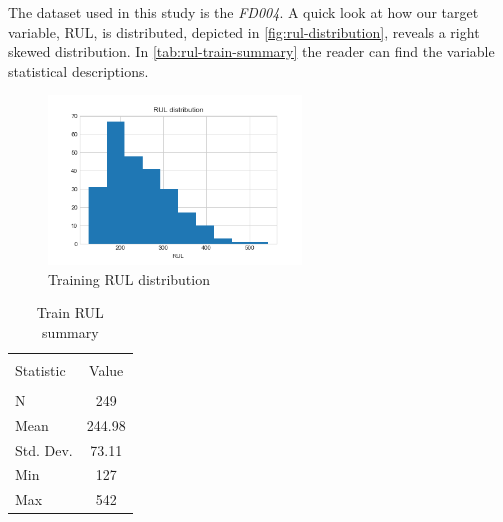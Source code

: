 \documentclass[letterpaper, 10 pt, conference, onecolumn]{ieeeconf}  %
\begin{document}
The dataset used in this study is the \textit{FD004}. A quick look at how our target variable, RUL, is distributed, depicted in \autoref{fig:rul-distribution}, reveals a right skewed distribution. In \autoref{tab:rul-train-summary} the reader can find the variable statistical descriptions.

\begin{figure}[!h]
    \centering
    \includegraphics[width=0.6\textwidth]{plots/eda_rul_distribution.png}
    \caption{Training RUL distribution}
    \label{fig:rul-distribution}
\end{figure}

\begin{table}[!h]
    \centering
    \begin{tabular}{l|c}
        \hline 
        \hline \\[-1.8ex] 
        Statistic & Value \\
        \hline \\[-1.8ex] 
         N & 249 \\
         Mean & 244.98 \\
         Std. Dev. & 73.11 \\
         Min & 127 \\
         Max & 542 \\
         \hline
         \hline
    \end{tabular}
    \caption{Train RUL summary}
    \label{tab:rul-train-summary}
\end{table}

\end{document}
